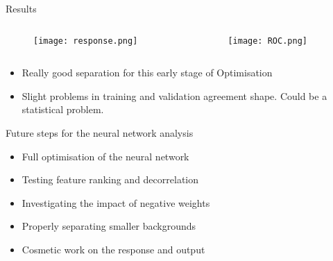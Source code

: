\begin{frame}{Results}
\begin{columns}
  \begin{column}{0.5\textwidth}
    \begin{figure}
      \texttt{[image: response.png]}
    \end{figure}
  \end{column}
  \begin{column}{0.5\textwidth}
    \begin{figure}
      \texttt{[image: ROC.png]}
    \end{figure}
  \end{column}
\end{columns}
%
\begin{itemize}
  \item Really good separation for this early stage of Optimisation
  \item Slight problems in training and validation agreement shape. Could be a statistical problem.
\end{itemize}
\end{frame}

\begin{frame}{Future steps for the neural network analysis}
  \begin{itemize}
    \item Full optimisation of the neural network
    \vspace{0.2cm}
    \item Testing feature ranking and decorrelation
    \vspace{0.2cm}
    \item Investigating the impact of negative weights
    \vspace{0.2cm}
    \item Properly separating smaller backgrounds
    \vspace{0.2cm}
    \item Cosmetic work on the response and output
  \end{itemize}
\end{frame}


